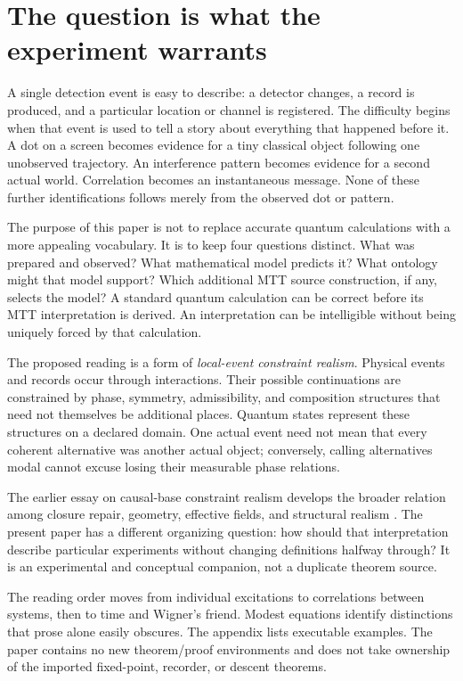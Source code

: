 \documentclass[11pt,a4paper]{article}
\begin{document}
\newpage
\tableofcontents
\newpage
\section{The question is what the experiment warrants}
\label{sec:orientation}
A single detection event is easy to describe: a detector changes, a record is produced, and a particular location or channel is registered. The difficulty begins when that event is used to tell a story about everything that happened before it. A dot on a screen becomes evidence for a tiny classical object following one unobserved trajectory. An interference pattern becomes evidence for a second actual world. Correlation becomes an instantaneous message. None of these further identifications follows merely from the observed dot or pattern.

The purpose of this paper is not to replace accurate quantum calculations with a more appealing vocabulary. It is to keep four questions distinct. What was prepared and observed? What mathematical model predicts it? What ontology might that model support? Which additional MTT source construction, if any, selects the model? A standard quantum calculation can be correct before its MTT interpretation is derived. An interpretation can be intelligible without being uniquely forced by that calculation.

The proposed reading is a form of \emph{local-event constraint realism}. Physical events and records occur through interactions. Their possible continuations are constrained by phase, symmetry, admissibility, and composition structures that need not themselves be additional places. Quantum states represent these structures on a declared domain. One actual event need not mean that every coherent alternative was another actual object; conversely, calling alternatives modal cannot excuse losing their measurable phase relations.

The earlier essay on causal-base constraint realism develops the broader relation among closure repair, geometry, effective fields, and structural realism \cite{NeroConstraint}. The present paper has a different organizing question: how should that interpretation describe particular experiments without changing definitions halfway through? It is an experimental and conceptual companion, not a duplicate theorem source.

The reading order moves from individual excitations to correlations between systems, then to time and Wigner's friend. Modest equations identify distinctions that prose alone easily obscures. The appendix lists executable examples. The paper contains no new theorem/proof environments and does not take ownership of the imported fixed-point, recorder, or descent theorems.
\end{document}
